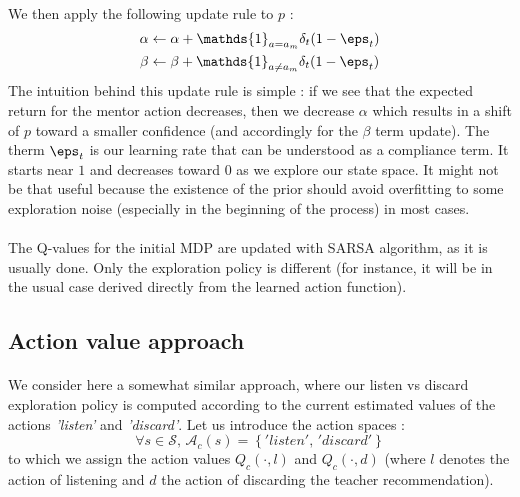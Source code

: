 \documentclass[a4paper]{report}
\begin{document}
{{{{			\paragraph{} We then apply the following update rule to $p$ : 
			\begin{equation}
				\begin{aligned}
					\alpha &\leftarrow \alpha +  \mathds{1}_{a=a_m}\delta_t (1-\eps_t)\\
					\beta &\leftarrow \beta +   \mathds{1}_{a\neq a_m}\delta_t (1-\eps_t)
				\end{aligned}
			\end{equation}
			The intuition behind this update rule is simple : if we see that the expected return for the mentor action decreases, then we decrease $\alpha$ which results in a shift of $p$ toward a smaller confidence (and accordingly for the $\beta$ term update). \newline 
			The therm $\eps_t$ is our learning rate that can be understood as a compliance term. It starts near $1$ and decreases toward $0$ as we explore our state space. It might not be that useful because the existence of the prior should avoid overfitting to some exploration noise (especially in the beginning of the process) in most cases. 
		
			\paragraph{} The Q-values for the initial MDP are updated with SARSA algorithm, as it is usually done. Only the exploration policy is different (for instance, it will be in the usual case derived directly from the learned action function). 
		}
	
		\subsection{Action value approach}
		{
			\paragraph{} We consider here a somewhat similar approach, where our listen vs discard exploration policy is computed according to the current estimated values of the actions \emph{'listen'} and \emph{'discard'}. Let us introduce the action spaces : 
			\begin{equation}
				\forall s\in\mathcal{S}, \, \mathcal{A}_c(s) = \left\{ 'listen', \, 'discard'\right\}
			\end{equation}
			to which we assign the action values $Q_c(\cdot,l)$ and  $Q_c(\cdot,d)$ (where $l$ denotes the action of listening and $d$ the action of discarding the teacher recommendation). 
			
}}}}
\end{document}
